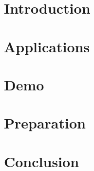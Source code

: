 \section[Intro]{Introduction}


\section[Apps]{Applications}


\section[Demo]{Demo}


\section[Prep]{Preparation}


\section[Concl]{Conclusion}
